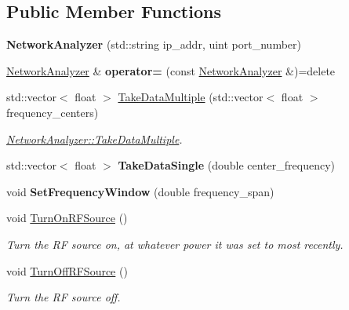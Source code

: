 \subsection*{Public Member Functions}
\begin{DoxyCompactItemize}
\item 
{\bfseries Network\+Analyzer} (std\+::string ip\+\_\+addr, uint port\+\_\+number)\hypertarget{class_network_analyzer_a80259e258ac41d5750f53565362f7420}{}\label{class_network_analyzer_a80259e258ac41d5750f53565362f7420}

\item 
\hyperlink{class_network_analyzer}{Network\+Analyzer} \& {\bfseries operator=} (const \hyperlink{class_network_analyzer}{Network\+Analyzer} \&)=delete\hypertarget{class_network_analyzer_a2785c012d28fb621e7218a9e471716e3}{}\label{class_network_analyzer_a2785c012d28fb621e7218a9e471716e3}

\item 
std\+::vector$<$ float $>$ \hyperlink{class_network_analyzer_a628344447ef7939877e49acb8ed72dab}{Take\+Data\+Multiple} (std\+::vector$<$ float $>$ frequency\+\_\+centers)
\begin{DoxyCompactList}\small\item\em \hyperlink{class_network_analyzer_a628344447ef7939877e49acb8ed72dab}{Network\+Analyzer\+::\+Take\+Data\+Multiple}. \end{DoxyCompactList}\item 
std\+::vector$<$ float $>$ {\bfseries Take\+Data\+Single} (double center\+\_\+frequency)\hypertarget{class_network_analyzer_a501cea89865657ee19c3bc457658092c}{}\label{class_network_analyzer_a501cea89865657ee19c3bc457658092c}

\item 
void {\bfseries Set\+Frequency\+Window} (double frequency\+\_\+span)\hypertarget{class_network_analyzer_a2fee24f238cc8ad5ecdb72da4fc7c848}{}\label{class_network_analyzer_a2fee24f238cc8ad5ecdb72da4fc7c848}

\item 
void \hyperlink{class_network_analyzer_a6d4e76a043fd30788167c4c0e187ed00}{Turn\+On\+R\+F\+Source} ()\hypertarget{class_network_analyzer_a6d4e76a043fd30788167c4c0e187ed00}{}\label{class_network_analyzer_a6d4e76a043fd30788167c4c0e187ed00}

\begin{DoxyCompactList}\small\item\em Turn the RF source on, at whatever power it was set to most recently. \end{DoxyCompactList}\item 
void \hyperlink{class_network_analyzer_aeeb9823df08d7b602d524583fcc94c26}{Turn\+Off\+R\+F\+Source} ()\hypertarget{class_network_analyzer_aeeb9823df08d7b602d524583fcc94c26}{}\label{class_network_analyzer_aeeb9823df08d7b602d524583fcc94c26}

\begin{DoxyCompactList}\small\item\em Turn the RF source off. \end{DoxyCompactList}\end{DoxyCompactItemize}


